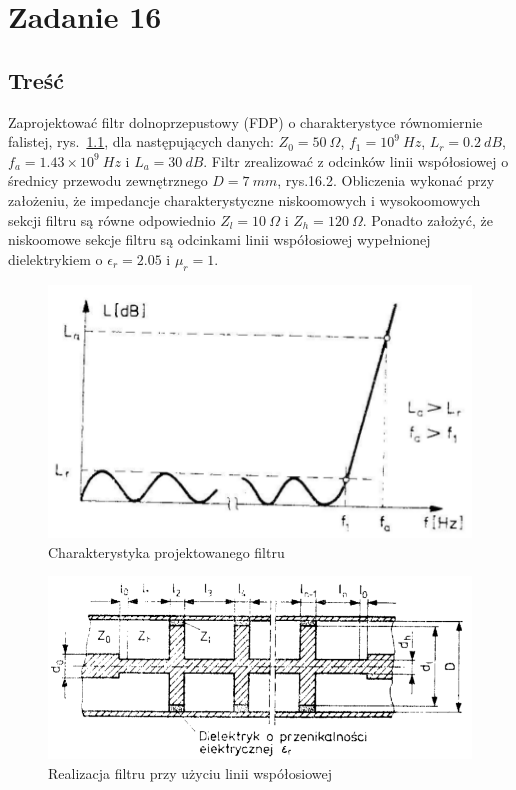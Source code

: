 \documentclass[rep.tex]{subfiles}
\begin{document}
\chapter{Zadanie 16}
\label{zad16}
\section{Treść}
Zaprojektować filtr dolnoprzepustowy (FDP) o charakterystyce równomiernie falistej, rys.~\ref{fig:zad16:cheb},
dla następujących danych: $Z_0 = 50~\Omega$, $f_1 = 10^9~Hz$, $L_r = 0.2~dB$, $f_a = 1.43 \times 10^9~Hz$ i $L_a = 30~dB$.
Filtr zrealizować z odcinków linii współosiowej o średnicy przewodu zewnętrznego $D = 7~mm$, rys.16.2.
Obliczenia wykonać przy założeniu,
że impedancje charakterystyczne niskoomowych i wysokoomowych sekcji filtru są równe odpowiednio
$Z_l = 10~\Omega$ i $Z_h = 120~\Omega$.
Ponadto założyć, że niskoomowe sekcje filtru są odcinkami linii współosiowej wypełnionej dielektrykiem o $\epsilon_r = 2.05$ i $\mu_r = 1$.

\begin{figure}[!htbp]
  \centering
  \includegraphics[scale=0.5]{fig/zad16/cheb}
  \caption{Charakterystyka projektowanego filtru}
  \label{fig:zad16:cheb}
\end{figure}

\begin{figure}[!htbp]
  \centering
  \includegraphics[scale=0.5]{fig/zad16/coax}
  \caption{Realizacja filtru przy użyciu linii współosiowej}
  \label{fig:zad16:coax}
\end{figure}
\end{document}
